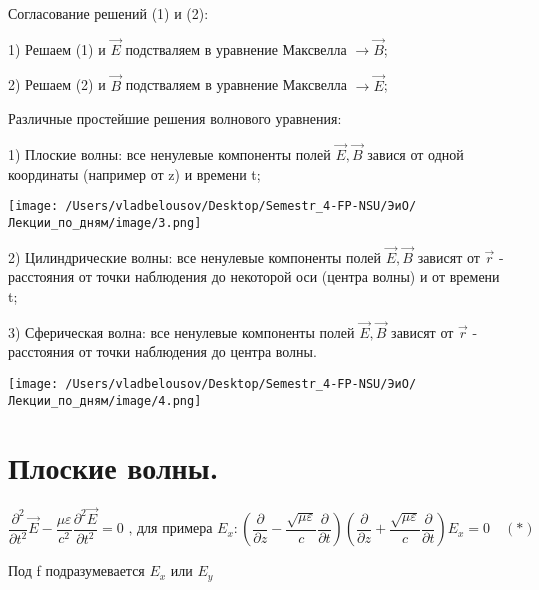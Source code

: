 \documentclass[12pt, a4paper]{report}
\begin{document}
Согласование решений (1) и (2): 

1) Решаем (1) и \( \vec{E} \)  подстваляем в уравнение Максвелла \( \to  \vec{B} \);

2) Решаем (2) и \( \vec{B} \)  подстваляем в уравнение Максвелла \( \to  \vec{E} \);

Различные простейшие решения волнового уравнения: 

1) Плоские волны: все ненулевые компоненты полей \( \vec{ E} ,\vec{ B} \) завися от одной координаты (например от z)  и времени t; 

\begin{center}
    \texttt{[image: /Users/vladbelousov/Desktop/Semestr\_4-FP-NSU/ЭиО/Лекции\_по\_дням/image/3.png]}
\end{center}


2) Цилиндрические волны: все ненулевые компоненты полей \( \vec{ E} ,\vec{ B} \) зависят от \( \vec{ r}  \)  - расстояния от точки наблюдения до некоторой оси (центра волны) и от времени t; 

3) Сферическая волна: все ненулевые компоненты полей \( \vec{ E} ,\vec{ B} \) зависят от \( \vec{r}  \)  - расстояния от точки наблюдения до центра волны.

\begin{center}
    \texttt{[image: /Users/vladbelousov/Desktop/Semestr\_4-FP-NSU/ЭиО/Лекции\_по\_дням/image/4.png]}
\end{center}

\newpage

\section{Плоские волны. }

\[ \frac{\partial ^2 }{\partial t^2 } \vec{E} - \frac{\mu \varepsilon}{c ^2} \frac{\partial ^2 \vec{ E}}{\partial t ^2 } =0 \text{ , для примера }  E_x : \left( \frac{\partial}{\partial z} - \frac{\sqrt{\mu \varepsilon} }{c} \frac{\partial}{\partial t }   \right) \left( \frac{\partial}{\partial z} + \frac{\sqrt{\mu \varepsilon} }{c} \frac{\partial}{\partial t } \right) E_x = 0  \quad  (*)  \] 

Под f подразумевается \( E_x  \) или \( E_y \)  
\end{document}

